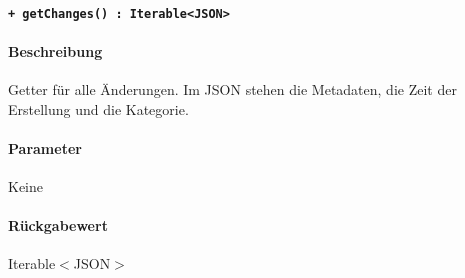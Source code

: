 \paragraph{\texttt{+ getChanges() : Iterable<JSON>}}\label{AP_Changes_getChanges}%
\paragraph*{Beschreibung}
Getter für alle Änderungen.
Im JSON stehen die Metadaten, die Zeit der Erstellung und die Kategorie.
\paragraph*{Parameter}
Keine
\paragraph*{Rückgabewert}
Iterable$<$JSON$>$